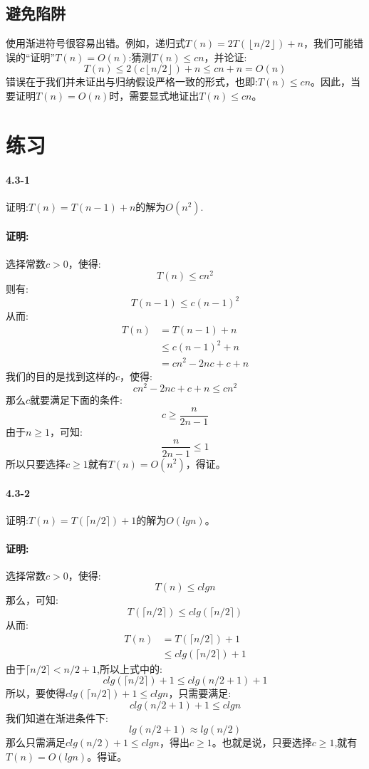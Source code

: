 \documentclass[a4paper,11pt]{article}
\newcommand{\floor}[1]{\left\lfloor #1 \right\rfloor}
\newcommand{\ceiling}[1]{\lceil #1 \rceil}
\begin{document}
\subsection*{避免陷阱}
使用渐进符号很容易出错。例如，递归式$T(n)=2T(\floor{n/2})+n$，我们可能错误的“证明”$T(n)=O(n)$:猜测$T(n)\leq cn$，并论证:
\[
	T(n)\leq 2(c\floor{n/2})+n\leq cn+n=O(n)
\]
错误在于我们并未证出与归纳假设严格一致的形式，也即:$T(n)\leq cn$。因此，当要证明$T(n)=O(n)$时，需要显式地证出$T(n)\leq cn$。
\section*{练习}
\paragraph*{4.3-1}证明:$T(n)=T(n-1)+n$的解为$O(n^2)$.
\paragraph*{证明:}选择常数$c>0$，使得:
\[T(n)\leq cn^2\]
则有:
\[T(n-1) \leq c(n-1)^2\]
从而:
\begin{equation*}
	\begin{split}
		T(n)&=T(n-1)+n\\
		& \leq c(n-1)^2+n\\
		&=cn^2-2nc+c+n
	\end{split}
\end{equation*}
我们的目的是找到这样的$c$，使得:
\[cn^2-2nc+c+n \leq cn^2\]
那么$c$就要满足下面的条件:
\[c\geq \frac{n}{2n-1}\]
由于$n\geq 1$，可知:
\[\frac{n}{2n-1}\leq 1\]
所以只要选择$c\geq 1$就有$T(n)=O(n^2)$，得证。
\paragraph*{4.3-2}证明:$T(n)=T(\ceiling{n/2})+1$的解为$O(lgn)$。
\paragraph*{证明:}选择常数$c>0$，使得:
\[T(n) \leq clgn\]
那么，可知:
\[T(\ceiling{n/2})\leq clg(\ceiling{n/2})\]
从而:
\begin{equation*}
	\begin{split}
		T(n)&=T(\ceiling{n/2})+1\\
		& \leq clg(\ceiling{n/2})+1
	\end{split}
\end{equation*}
由于$\ceiling{n/2}<n/2+1$,所以上式中的:
\[clg(\ceiling{n/2})+1\leq clg(n/2+1)+1\]
所以，要使得$clg(\ceiling{n/2})+1\leq clgn$，只需要满足:
\[clg(n/2+1)+1 \leq clgn\]
我们知道在渐进条件下:\[lg(n/2+1)\approx lg(n/2)\]
那么只需满足$clg(n/2)+1\leq clgn$，得出$c\geq 1$。也就是说，只要选择$c\geq 1$,就有$T(n)=O(lgn)$。得证。
\end{document}
